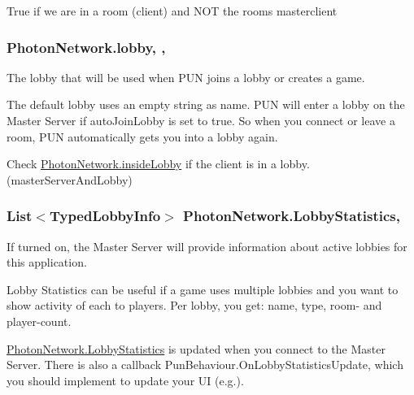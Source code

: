 True if we are in a room (client) and N\+OT the room\textquotesingle{}s masterclient 

\subsubsection[{\texorpdfstring{lobby}{lobby}}]{ Photon\+Network.\+lobby\hspace{0.3cm}{\ttfamily [static]}, {\ttfamily [get]}, {\ttfamily [set]}}\hypertarget{class_photon_network_a3af7f8d0082599e6e3a56a5b1481a505}{}\label{class_photon_network_a3af7f8d0082599e6e3a56a5b1481a505}


The lobby that will be used when P\+UN joins a lobby or creates a game. 

The default lobby uses an empty string as name. P\+UN will enter a lobby on the Master Server if auto\+Join\+Lobby is set to true. So when you connect or leave a room, P\+UN automatically gets you into a lobby again.

Check \hyperlink{class_photon_network_a8ad64b1a76c7918bbe5642639afff458}{Photon\+Network.\+inside\+Lobby} if the client is in a lobby. (master\+Server\+And\+Lobby) 
\subsubsection[{\texorpdfstring{Lobby\+Statistics}{LobbyStatistics}}]{\setlength{\rightskip}{0pt plus 5cm}List$<${\bf Typed\+Lobby\+Info}$>$ Photon\+Network.\+Lobby\+Statistics\hspace{0.3cm}{\ttfamily [static]}, {\ttfamily [get]}}\hypertarget{class_photon_network_abdced09cccf61ae817cb97705ffce137}{}\label{class_photon_network_abdced09cccf61ae817cb97705ffce137}


If turned on, the Master Server will provide information about active lobbies for this application. 

Lobby Statistics can be useful if a game uses multiple lobbies and you want to show activity of each to players. Per lobby, you get\+: name, type, room-\/ and player-\/count.

\hyperlink{class_photon_network_abdced09cccf61ae817cb97705ffce137}{Photon\+Network.\+Lobby\+Statistics} is updated when you connect to the Master Server. There is also a callback Pun\+Behaviour.\+On\+Lobby\+Statistics\+Update, which you should implement to update your UI (e.\+g.).

